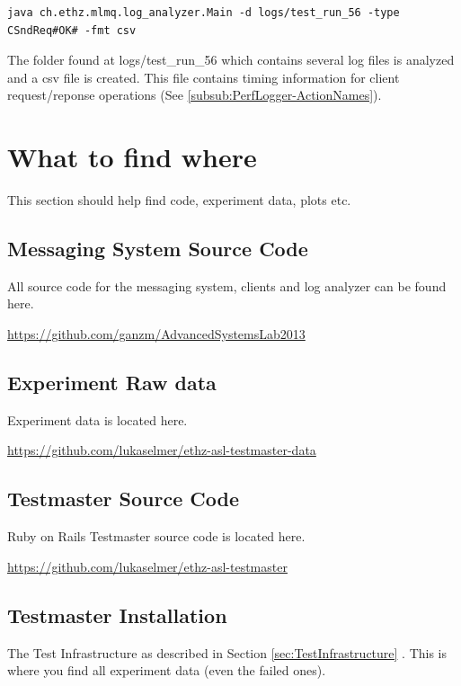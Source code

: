 \documentclass[a4paper]{article}
\begin{document}
\begin{verbatim}
java ch.ethz.mlmq.log_analyzer.Main -d logs/test_run_56 -type CSndReq#OK# -fmt csv
\end{verbatim}

The folder found at logs/test\_run\_56 which contains several log files is analyzed and a csv file is created. This file contains timing information for client request/reponse operations (See \ref{subsub:PerfLogger-ActionNames}).

\section{What to find where}

This section should help find code, experiment data, plots etc.

\subsection{Messaging System Source Code}
\label{sec:WhereToFind:MessagingSystemSrc}
All source code for the messaging system, clients and log analyzer can be found here.

\url{https://github.com/ganzm/AdvancedSystemsLab2013}


\subsection{Experiment Raw data}
Experiment data is located here.

\url{https://github.com/lukaselmer/ethz-asl-testmaster-data}

\subsection{Testmaster Source Code}
Ruby on Rails Testmaster source code is located here.

\url{https://github.com/lukaselmer/ethz-asl-testmaster}

\subsection{Testmaster Installation}
The Test Infrastructure as described in Section \ref{sec:TestInfrastructure}   . This is where you find all experiment data (even the failed ones).
\end{document}
